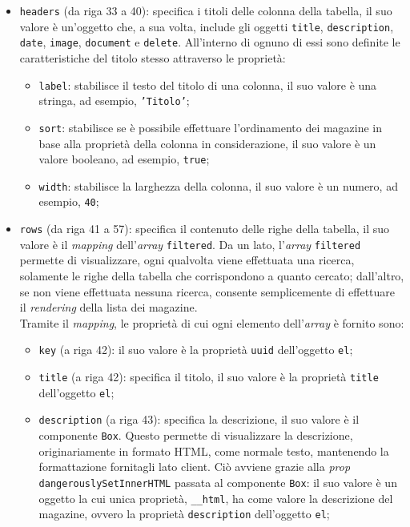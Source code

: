 \begin{itemize}
    \item \texttt{headers} (da riga 33 a 40): specifica i titoli delle colonna della tabella, il suo valore è un'oggetto che, a sua volta, include gli oggetti \texttt{title}, \texttt{description}, \texttt{date}, \texttt{image}, \texttt{document} e \texttt{delete}. All'interno di ognuno di essi sono definite le caratteristiche del titolo stesso attraverso le proprietà:
        \begin{itemize}
            \item \texttt{label}: stabilisce il testo del titolo di una colonna, il suo valore è una stringa, ad esempio, \texttt{'Titolo'};
            
            \item \texttt{sort}: stabilisce se è possibile effettuare l'ordinamento dei magazine in base alla proprietà della colonna in considerazione, il suo valore è un valore booleano, ad esempio, \texttt{true};
            
            \item \texttt{width}: stabilisce la larghezza della colonna, il suo valore è un numero, ad esempio, \texttt{40};  
        \end{itemize}   
    \item \texttt{rows} (da riga 41 a 57): specifica il contenuto delle righe della tabella, il suo valore è il \textit{mapping} dell'\textit{array} \texttt{filtered}. Da un lato, l'\textit{array} \texttt{filtered} permette di visualizzare, ogni qualvolta viene effettuata una ricerca, solamente le righe della tabella che corrispondono a quanto cercato; dall'altro, se non viene effettuata nessuna ricerca, consente semplicemente di effettuare il \textit{rendering} della lista dei magazine.\\
    Tramite il \textit{mapping}, le proprietà di cui ogni elemento dell'\textit{array} è fornito sono:
    \begin{itemize}
        \item \texttt{key} (a riga 42): il suo valore è la proprietà \texttt{uuid} dell'oggetto \texttt{el};
        
        \item \texttt{title} (a riga 42): specifica il titolo, il suo valore è la proprietà \texttt{title} dell'oggetto \texttt{el};
        
        \item \texttt{description} (a riga 43): specifica la descrizione, il suo valore è il componente \texttt{Box}. Questo permette di visualizzare la descrizione, originariamente in formato HTML, come normale testo, mantenendo la formattazione fornitagli lato client. Ciò avviene grazie alla \textit{prop} \texttt{dangerouslySetInnerHTML} passata al componente \texttt{Box}: il suo valore è un oggetto la cui unica proprietà, \texttt{\_\_html}, ha come valore la descrizione del magazine, ovvero la proprietà \texttt{description} dell'oggetto \texttt{el};
        

\end{itemize}
\end{itemize}
